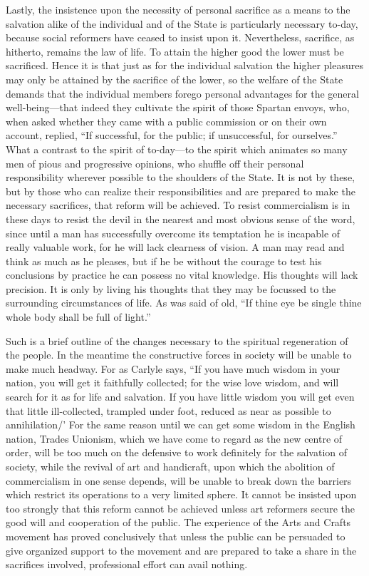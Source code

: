 \documentclass{book}
\begin{document}
Lastly, the insistence upon the necessity of personal sacrifice as a means to the salvation alike of the individual and of the State is particularly necessary to-day, because social reformers have ceased to insist upon it. Nevertheless, sacrifice, as hitherto, remains the law of life. To attain the higher good the lower must be sacrificed. Hence it is that just as for the individual salvation the higher pleasures may only be attained by the sacrifice of the lower, so the welfare of the State demands that the individual members forego personal advantages for the general well-being—that indeed they cultivate the spirit of those Spartan envoys, who, when asked whether they came with a public commission or on their own account, replied, “If successful, for the public; if unsuccessful, for ourselves.” What a contrast to the spirit of to-day—to the spirit which animates so many men of pious and progressive opinions, who shuffle off their personal responsibility wherever possible to the shoulders of the State. It is not by these, but by those who can realize their responsibilities and are prepared to make the necessary sacrifices, that reform will be achieved. To resist commercialism is in these days to resist the devil in the nearest and most obvious sense of the word, since until a man has successfully overcome its temptation he is incapable of really valuable work, for he will lack clearness of vision. A man may read and think as much as he pleases, but if he be without the courage to test his conclusions by practice he can possess no vital knowledge. His thoughts will lack precision. It is only by living his thoughts that they may be focussed to the surrounding circumstances of life. As was said of old, “If thine eye be single thine whole body shall be full of light.”

Such is a brief outline of the changes necessary to the spiritual regeneration of the people. In the meantime the constructive forces in society will be unable to make much headway. For as Carlyle says, “If you have much wisdom in your nation, you will get it faithfully collected; for the wise love wisdom, and will search for it as for life and salvation. If you have little wisdom you will get even that little ill-collected, trampled under foot, reduced as near as possible to annihilation/’ For the same reason until we can get some wisdom in the English nation, Trades Unionism, which we have come to regard as the new centre of order, will be too much on the defensive to work definitely for the salvation of society, while the revival of art and handicraft, upon which the abolition of commercialism in one sense depends, will be unable to break down the barriers which restrict its operations to a very limited sphere. It cannot be insisted upon too strongly that this reform cannot be achieved unless art reformers secure the good will and cooperation of the public. The experience of the Arts and Crafts movement has proved conclusively that unless the public can be persuaded to give organized support to the movement and are prepared to take a share in the sacrifices involved, professional effort can avail nothing.
\end{document}
